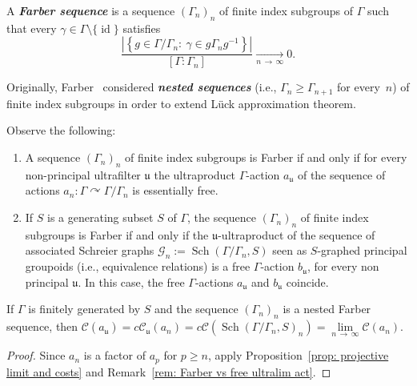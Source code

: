 \documentclass[AHL,Unicode,longabstracts,published]{cedram}
\newcommand{\defin}[1]{\textbf{\emph{#1}}}
\newcommand{\acting}{\curvearrowright}
\newcommand{\cost}{\mathcal{C}}
\newcommand{\ccost}{c\mathcal{C}}
\newcommand{\cg}{\mathcal{G}}
\DeclareMathOperator{\id}{id}
\DeclareMathOperator{\Sch}{Sch}
\newcommand{\ul}{\mathfrak{u}}
\begin{document}
\begin{defi}\label{def: Farber sequence}
A
\defin{Farber sequence} is a sequence $(\Gamma_n)_n$ of finite index subgroups of $\Gamma$ such that every $\gamma\in \Gamma\setminus\{\id\}$ satisfies
\begin{equation*}
\frac{\left|\left\lbrace g\in \Gamma/\Gamma_n:\ \gamma\in g\Gamma_ng^{-1}
\right\rbrace\right|}{[\Gamma:\Gamma_n]}\underset{n\,\to\,\infty}{\longrightarrow} 0.
\end{equation*}
\end{defi}

Originally, Farber~\cite{Farber-1998-L2-approx} considered
\defin{nested sequences} (i.e., $\Gamma_n\geq \Gamma_{n+1}$ for every~$n$) of finite index subgroups in order to extend L\"uck approximation theorem.


\begin{rema}\label{rem: Farber vs free ultralim act}
Observe the following:
\begin{enumerate}
\item \label{rema4.8.1} A sequence $(\Gamma_n)_n$ of finite index subgroups is Farber if and only if for every non-principal ultrafilter $\ul$ the ultraproduct $\Gamma$-action $a_{\ul}$ of the sequence of actions $a_n: \Gamma \acting \Gamma/\Gamma_n$ is essentially free.

\item \label{rema4.8.2}If $S$ is a generating subset $S$ of $\Gamma$, the sequence $(\Gamma_n)_n$ of finite index subgroups is Farber if and only if the $\ul$-ultraproduct of the sequence of associated Schreier graphs $\cg_n:=\Sch(\Gamma/\Gamma_n, S)$ seen as $S$-graphed principal groupoids (i.e., equivalence relations) is a free $\Gamma$-action $b_{\ul}$, for every non principal $\ul$. In this case, the free $\Gamma$-actions $a_{\ul}$ and $b_{\ul}$ coincide.
\end{enumerate}
\end{rema}



\begin{coro}\label{cor: nested Farber seq}
If $\Gamma$ is finitely generated by $S$ and the sequence $(\Gamma_n)_n$ is a nested Farber sequence, then $\cost(a_{\ul})=\ccost_{\ul}(a_n)=\ccost(\Sch(\Gamma/\Gamma_n, S)_n)=\lim\limits_{n\,\to\,\infty} \cost(a_n)$.
\end{coro}

\begin{proof}
Since $a_n$ is a factor of $a_p$ for $p\geq n$, apply Proposition~\ref{prop: projective limit and costs} and Remark~\ref{rem: Farber vs free ultralim act}.
\end{proof}
\end{document}
